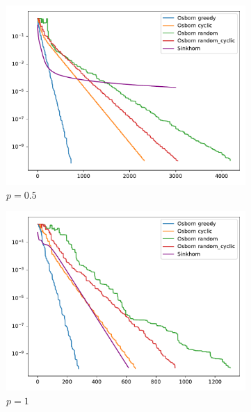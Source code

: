 \begin{figure}[H]
    \centering
    \begin{subfigure}[b]{.18\textwidth}
        \centering
        \includegraphics[width=\textwidth]{figures/minkowski/osborn_vs_sinkhorn_dist2_0.01_1e-10_0.5_0.5}
        \caption{\(p = 0.5\)}
    \end{subfigure}
    \hfill
    \begin{subfigure}[b]{.18\textwidth}
        \centering
        \includegraphics[width=\textwidth]{figures/minkowski/osborn_vs_sinkhorn_dist2_0.01_1e-10_1_1}
        \caption{\(p = 1\)}
    \end{subfigure}
    \hfill
    \begin{subfigure}[b]{.18\textwidth}

\end{subfigure}
\end{figure}
